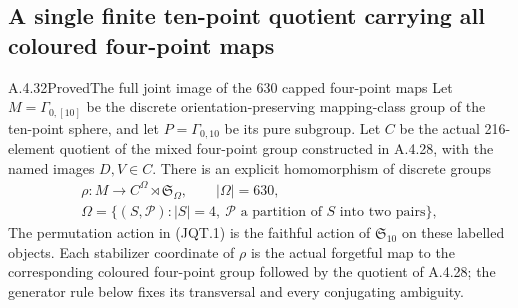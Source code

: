 \subsection{A single finite ten-point quotient carrying all coloured four-point maps}

\begin{result}{A.4.32}{Proved}{The full joint image of the 630 capped four-point maps}
\label{thm:sphere10-joint-capped-quotient}
Let $M=\Gamma_{0,[10]}$ be the discrete orientation-preserving
mapping-class group of the ten-point sphere, and let
$P=\Gamma_{0,10}$ be its pure subgroup.  Let $C$ be the actual
216-element quotient of the mixed four-point group constructed
in A.4.28, with the named images $D,V\in C$.  There is an
explicit homomorphism of discrete groups
\[
\begin{gathered}
 \rho:M\longrightarrow C^\Omega\rtimes\mathfrak S_\Omega,
 \qquad |\Omega|=630,\\
 \Omega=\{(S,\mathcal P):|S|=4,\ 
             \mathcal P\text{ a partition of }S\text{ into two pairs}\},
\end{gathered}                                               \tag{JQT.1}
\]
The permutation action in (JQT.1) is the faithful action of
$\mathfrak S_{10}$ on these labelled objects.  Each stabilizer
coordinate of $\rho$ is the actual forgetful map to the
corresponding coloured four-point group followed by the
quotient of A.4.28; the generator rule below fixes its
transversal and every conjugating ambiguity.


\end{result}
